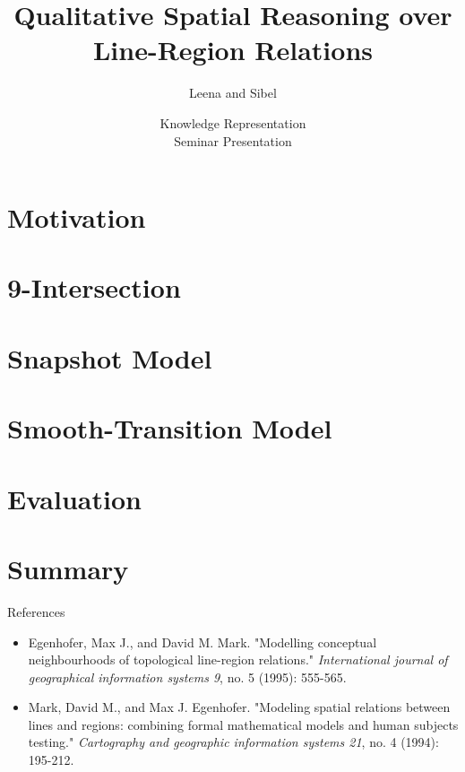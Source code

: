 \documentclass{beamer}
\begin{document}
	\title{Qualitative Spatial Reasoning over Line-Region Relations}
	\author{Leena and Sibel}
	\date{Knowledge Representation\\Seminar Presentation}
	
	\begin{frame}
		\titlepage
	\end{frame}
	
	\section{Motivation}
	
	
	\section{9-Intersection}	
	
	
	\section{Snapshot Model}	
	
	
	\section{Smooth-Transition Model}	
		
	
	\section{Evaluation}	
	
	
	\section{Summary}
	
	
	\begin{comment}
		- citing style chicago
		- sorted by relevance
	\end{comment}
	\begin{frame}{References}
		\begin{itemize}
			\item Egenhofer, Max J., and David M. Mark. "Modelling conceptual neighbourhoods of topological line-region relations." \textit{International journal of geographical information systems 9}, no. 5 (1995): 555-565.
			
			\item Mark, David M., and Max J. Egenhofer. "Modeling spatial relations between lines and regions: combining formal mathematical models and human subjects testing." \textit{Cartography and geographic information systems 21}, no. 4 (1994): 195-212.
		\end{itemize}
	\end{frame}
	
\end{document}
